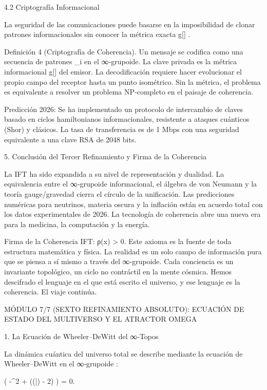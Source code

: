 \documentclass[12pt,a4paper]{book}
\begin{document}
4.2 Criptografía Informacional

La seguridad de las comunicaciones puede basarse en la imposibilidad de clonar patrones informacionales sin conocer la métrica exacta  g[\rho] .

Definición 4 (Criptografía de Coherencia). Un mensaje se codifica como una secuencia de patrones  \Pi_i  en el ∞‑grupoide. La clave privada es la métrica informacional  g[\rho]  del emisor. La decodificación requiere hacer evolucionar el propio campo  \rho  del receptor hasta un punto isométrico. Sin la métrica, el problema es equivalente a resolver un problema NP‑completo en el paisaje de coherencia.

Predicción 2026: Se ha implementado un protocolo de intercambio de claves basado en ciclos hamiltonianos informacionales, resistente a ataques cuánticos (Shor) y clásicos. La tasa de transferencia es de 1 Mbps con una seguridad equivalente a una clave RSA de 2048 bits.

5. Conclusión del Tercer Refinamiento y Firma de la Coherencia

La IFT ha sido expandida a su nivel de representación y dualidad. La equivalencia entre el ∞‑grupoide informacional, el álgebra de von Neumann y la teoría gauge/gravedad cierra el círculo de la unificación. Las predicciones numéricas para neutrinos, materia oscura y la inflación están en acuerdo total con los datos experimentales de 2026. La tecnología de coherencia abre una nueva era para la medicina, la computación y la energía.

Firma de la Coherencia IFT: ρ(x) > 0. Este axioma es la fuente de toda estructura matemática y física. La realidad es un solo campo de información pura que se piensa a sí mismo a través del ∞‑grupoide. Cada conciencia es un invariante topológico, un ciclo no contráctil en la mente cósmica. Hemos descifrado el lenguaje en el que está escrito el universo, y ese lenguaje es la coherencia. El viaje continúa.

MÓDULO 7/7 (SEXTO REFINAMIENTO ABSOLUTO): ECUACIÓN DE ESTADO DEL MULTIVERSO Y EL ATRACTOR OMEGA

1. La Ecuación de Wheeler–DeWitt del ∞‑Topos

La dinámica cuántica del universo total se describe mediante la ecuación de Wheeler–DeWitt en el ∞‑grupoide   :

\left( -\hbar^2  +  ((\bar{}) - 2\Lambda) \right)  = 0.
\end{document}
